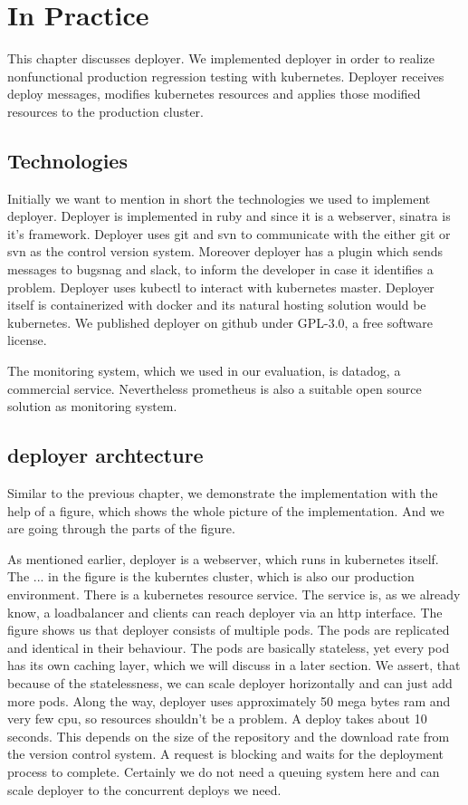 \chapter{In Practice}

This chapter discusses deployer. We implemented deployer in order to realize nonfunctional
production regression testing with kubernetes. Deployer receives deploy messages, modifies
kubernetes resources and applies those modified resources to the production cluster.


\section{Technologies}

Initially we want to mention in short the technologies we used to implement
deployer. Deployer is implemented in ruby and since it is a webserver, sinatra is it's
framework. Deployer uses git and svn to communicate with the either git or svn as the
control version system. Moreover deployer has a plugin which sends messages to bugsnag and
slack, to inform the developer in case it identifies a problem. Deployer uses kubectl to
interact with kubernetes master. Deployer itself is containerized with docker and its
natural hosting solution would be kubernetes. We published deployer on github under
GPL-3.0, a free
software license.

The monitoring system, which we used in our evaluation, is datadog, a commercial
service. Nevertheless prometheus is also a suitable open source solution as monitoring
system.

\section{deployer archtecture}

Similar to the previous chapter, we demonstrate the implementation with the help of a
figure, which shows the whole picture of the implementation. And we are going through the
parts of the figure.

As mentioned earlier, deployer is a webserver, which runs in kubernetes itself. The ... in
the figure is the kuberntes cluster, which is also our production environment. There is a
kubernetes resource service. The service is, as we already know, a loadbalancer and
clients can reach deployer via an http interface. The figure shows us that deployer
consists of multiple pods. The pods are replicated and identical in their behaviour. The
pods are basically stateless, yet every pod has its own caching layer, which we will
discuss in a later section. We assert, that because of the statelessness, we can scale
deployer horizontally and can just add more pods. Along the way, deployer uses
approximately 50 mega bytes ram and very few cpu, so resources shouldn't be a problem. A
deploy takes about 10 seconds. This depends on the size of the repository and the download
rate from the version control system. A request is blocking and waits for the deployment
process to complete. Certainly we do not need a queuing system here and can scale deployer
to the concurrent deploys we need.

